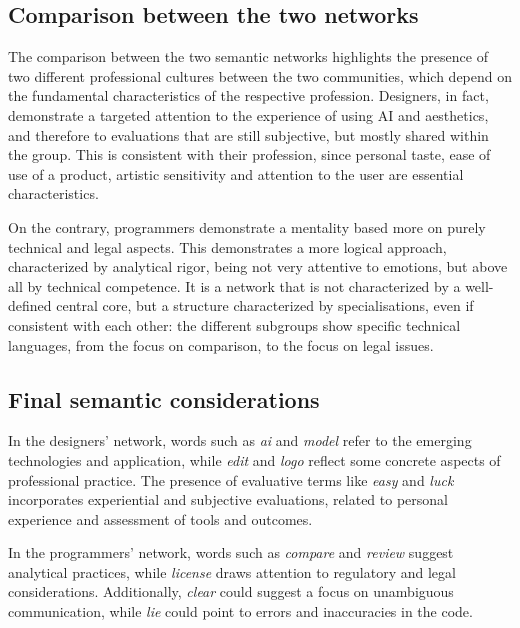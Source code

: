 \documentclass[conference]{IEEEtran}
\begin{document}
\subsection{Comparison between the two networks}
The comparison between the two semantic networks highlights the presence of two different professional cultures between the two communities, which depend on the fundamental characteristics of the respective profession. Designers, in fact, demonstrate a targeted attention to the experience of using AI and aesthetics, and therefore to evaluations that are still subjective, but mostly shared within the group. This is consistent with their profession, since personal taste, ease of use of a product, artistic sensitivity and attention to the user are essential characteristics.

On the contrary, programmers demonstrate a mentality based more on purely technical and legal aspects. This demonstrates a more logical approach, characterized by analytical rigor, being not very attentive to emotions, but above all by technical competence. It is a network that is not characterized by a well-defined central core, but a structure characterized by specialisations, even if consistent with each other: the different subgroups show specific technical languages, from the focus on comparison, to the focus on legal issues.

\subsection{Final semantic considerations}
In the designers’ network, words such as \textit{ai} and \textit{model} refer to the emerging technologies and application, while \textit{edit} and \textit{logo} reflect some concrete aspects of professional practice. The presence of evaluative terms like \textit{easy} and \textit{luck} incorporates experiential and subjective evaluations, related to personal experience and assessment of tools and outcomes.

In the programmers’ network, words such as \textit{compare} and \textit{review} suggest analytical practices, while \textit{license} draws attention to regulatory and legal considerations. Additionally, \textit{clear} could suggest a focus on unambiguous communication, while \textit{lie} could point to errors and inaccuracies in the code.
\end{document}
